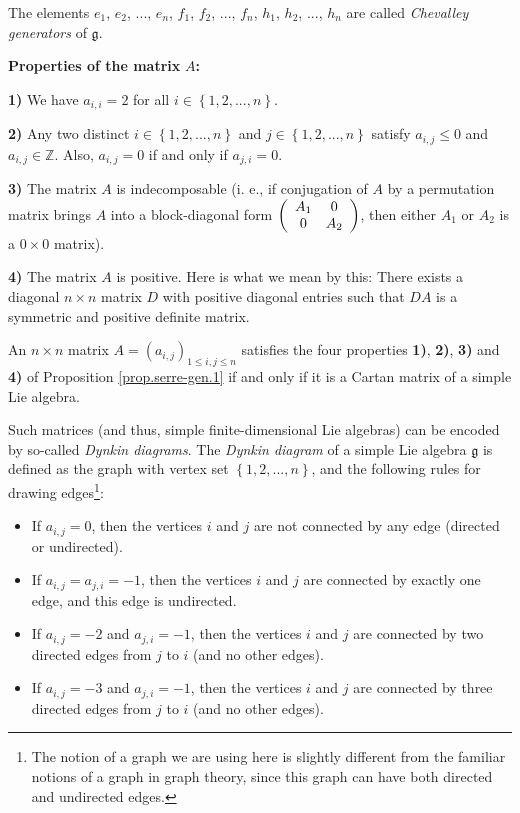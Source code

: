 \documentclass[etingof-lie.tex]{subfiles}
\begin{document}
\begin{proposition}
The elements $e_{1}$, $e_{2}$, $...$, $e_{n}$, $f_{1}$, $f_{2}$, $...$,
$f_{n}$, $h_{1}$, $h_{2}$, $...$, $h_{n}$ are called \textit{Chevalley
generators} of $\mathfrak{g}$.

\textbf{Properties of the matrix }$A$\textbf{:}

\textbf{1)} We have $a_{i,i}=2$ for all $i\in\left\{  1,2,...,n\right\}  $.

\textbf{2)} Any two distinct $i\in\left\{  1,2,...,n\right\}  $ and
$j\in\left\{  1,2,...,n\right\}  $ satisfy $a_{i,j}\leq0$ and $a_{i,j}%
\in\mathbb{Z}$. Also, $a_{i,j}=0$ if and only if $a_{j,i}=0$.

\textbf{3)} The matrix $A$ is indecomposable (i. e., if conjugation of $A$ by
a permutation matrix brings $A$ into a block-diagonal form $\left(
\begin{array}
[c]{cc}%
A_{1} & 0\\
0 & A_{2}%
\end{array}
\right)  $, then either $A_{1}$ or $A_{2}$ is a $0\times0$ matrix).

\textbf{4)} The matrix $A$ is positive. Here is what we mean by this: There
exists a diagonal $n\times n$ matrix $D$ with positive diagonal entries such
that $DA$ is a symmetric and positive definite matrix.
\end{proposition}

\begin{theorem}
An $n\times n$ matrix $A=\left(  a_{i,j}\right)  _{1\leq i,j\leq n}$ satisfies
the four properties \textbf{1)}, \textbf{2)}, \textbf{3)} and \textbf{4)} of
Proposition \ref{prop.serre-gen.1} if and only if it is a Cartan matrix of a
simple Lie algebra.
\end{theorem}

Such matrices (and thus, simple finite-dimensional Lie algebras) can be
encoded by so-called \textit{Dynkin diagrams}. The \textit{Dynkin diagram} of
a simple Lie algebra $\mathfrak{g}$ is defined as the graph with vertex set
$\left\{  1,2,...,n\right\}  $, and the following rules for drawing
edges\footnote{The notion of a graph we are using here is slightly different
from the familiar notions of a graph in graph theory, since this graph can
have both directed and undirected edges.}:

\begin{itemize}
\item If $a_{i,j}=0$, then the vertices $i$ and $j$ are not connected by any
edge (directed or undirected).

\item If $a_{i,j}=a_{j,i}=-1$, then the vertices $i$ and $j$ are connected by
exactly one edge, and this edge is undirected.

\item If $a_{i,j}=-2$ and $a_{j,i}=-1$, then the vertices $i$ and $j$ are
connected by two directed edges from $j$ to $i$ (and no other edges).

\item If $a_{i,j}=-3$ and $a_{j,i}=-1$, then the vertices $i$ and $j$ are
connected by three directed edges from $j$ to $i$ (and no other edges).
\end{itemize}
\end{document}
